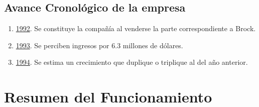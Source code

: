 \documentclass[12pt,a4paper,spanish]{article}
\begin{document}
	\subsection{Avance Cronol\'{o}gico de la empresa}
	\begin{enumerate}
		\item \underline{1992}. Se constituye la compa\~{n}\'{i}a al venderse la parte correspondiente a Brock. 
		\item \underline{1993}. Se perciben ingresos por 6.3 millones de d\'{o}lares.
		\item \underline{1994}. Se estima un crecimiento que duplique o triplique al del a\~{n}o anterior.
	\end{enumerate}

\section{Resumen del Funcionamiento}
\end{document}

